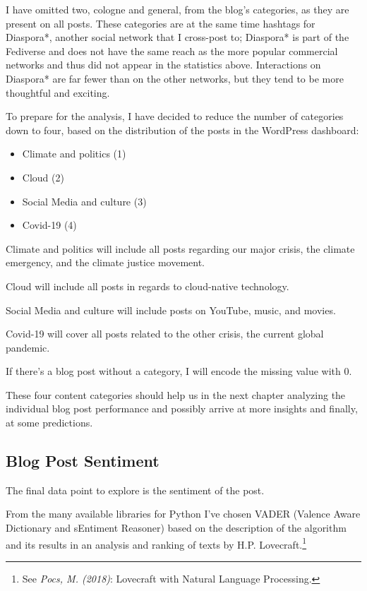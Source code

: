 I have omitted two, cologne and general, from the blog's categories, as they are present on all posts. These categories are at the same time hashtags for Diaspora*, another social network that I cross-post to; Diaspora* is part of the Fediverse and does not have the same reach as the more popular commercial networks and thus did not appear in the statistics above. Interactions on Diaspora* are far fewer than on the other networks, but they tend to be more thoughtful and exciting.

To prepare for the analysis, I have decided to reduce the number of categories down to four, based on the distribution of the posts in the WordPress dashboard:

\begin{itemize}
\item Climate and politics (1)
\item Cloud (2)
\item Social Media and culture (3)
\item Covid-19 (4)
\end{itemize}

Climate and politics will include all posts regarding our major crisis, the climate emergency, and the climate justice movement.

Cloud will include all posts in regards to cloud-native technology.

Social Media and culture will include posts on YouTube, music, and movies.

Covid-19 will cover all posts related to the other crisis, the current global pandemic.

 If there's a blog post without a category, I will encode the missing value with 0.

These four content categories should help us in the next chapter analyzing the individual blog post performance and possibly arrive at more insights and finally, at some predictions.

\subsection{Blog Post Sentiment}

The final data point to explore is the sentiment of the post.

From the many available libraries for Python I've chosen VADER (Valence Aware Dictionary and sEntiment Reasoner) based on the description of the algorithm and its results in an analysis and ranking of texts by H.P. Lovecraft.\footnote{See \textit{Pocs, M. (2018)}: Lovecraft with Natural Language Processing.\cite{lovecraftAnalysis}}

